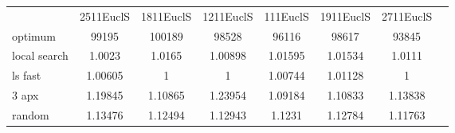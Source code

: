 \begin{tabular}[ht]{|l||c|c|c|c|c|c|H}
 & 2511EuclS & 1811EuclS & 1211EuclS & 111EuclS & 1911EuclS & 2711EuclS & \\  
optimum &99195 & 100189 & 98528 & 96116 & 98617 & 93845 & \\ 
local search &1.0023 & 1.0165 & 1.00898 & 1.01595 & 1.01534 & 1.0111 & \\ 
ls fast &1.00605 & 1 & 1 & 1.00744 & 1.01128 & 1 & \\ 
3 apx &1.19845 & 1.10865 & 1.23954 & 1.09184 & 1.10833 & 1.13838 & \\ 
random &1.13476 & 1.12494 & 1.12943 & 1.1231 & 1.12784 & 1.11763 & \\ 
\end{tabular}